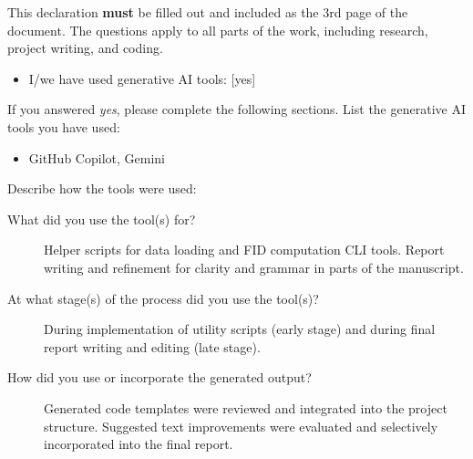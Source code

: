 \documentclass[10pt,a4paper]{article}
\begin{document}
This declaration \textbf{must} be filled out and included as the 3rd page of the document. The questions apply to all parts of the work, including research, project writing, and coding.
\begin{itemize}
\item I/we have used generative AI tools: [yes]
\end{itemize}
If you answered \emph{yes}, please complete the following sections. List the generative AI tools you have used:
\begin{itemize}
\item GitHub Copilot, Gemini
\end{itemize}
Describe how the tools were used:
\begin{description}
\item[What did you use the tool(s) for?] Helper scripts for data loading and FID computation CLI tools. Report writing and refinement for clarity and grammar in parts of the manuscript.
\item[At what stage(s) of the process did you use the tool(s)?] During implementation of utility scripts (early stage) and during final report writing and editing (late stage).
\item[How did you use or incorporate the generated output?] Generated code templates were reviewed and integrated into the project structure. Suggested text improvements were evaluated and selectively incorporated into the final report.
\end{description}

\newpage



\end{document}
